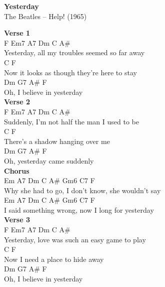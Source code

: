 \documentclass[a4paper]{article}
\begin{document}
    \begin{center}
        \textbf{Yesterday}
        ~\\
        The Beatles -- Help! (1965)
    \end{center}
    {
        \scriptsize
        \textbf{Verse 1}
        ~\\
        {
            \cutive
            \obeyspaces
F        Em7       A7                 Dm       C A\#
\\
Yesterday,  all my troubles seemed so far away
\\
       C                       F
\\
Now it looks as though they're here to stay
\\
    Dm  G7       A\#    F
\\
Oh, I believe in yesterday
\\

        }
        \textbf{Verse 2}
        ~\\
        {
            \cutive
            \obeyspaces
F       Em7        A7             Dm         C A\#
\\
Suddenly,  I'm not half the man I used to be
\\
          C              F
\\
There's a shadow hanging over me
\\
    Dm    G7       A\#   F
\\
Oh, yesterday came suddenly
\\

        }
        \textbf{Chorus}
        ~\\
        {
            \cutive
            \obeyspaces
Em  A7  Dm  C  A\#          Gm6       C7       F
\\
Why she had to go, I don't know, she wouldn't say
\\
Em A7   Dm  C     A\#           Gm6      C7    F
\\
I  said something wrong, now I long for yesterday
\\

        }
        \textbf{Verse 3}
        ~\\
        {
            \cutive
            \obeyspaces
F        Em7         A7           Dm           C A\#
\\
Yesterday,  love was such an easy game to play
\\
      C               F
\\
Now I need a place to hide away
\\
    Dm  G7       A\#    F
\\
Oh, I believe in yesterday
\\

}}
\end{document}

